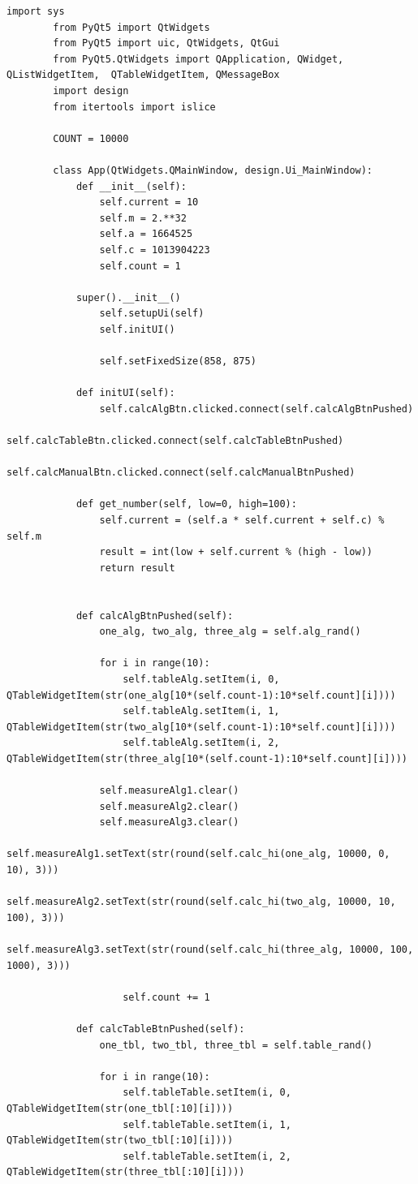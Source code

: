 \documentclass[14pt, a4paper]{extarticle}
\begin{document}
	\begin{lstlisting}[caption=lab3.py]
		import sys
		from PyQt5 import QtWidgets
		from PyQt5 import uic, QtWidgets, QtGui
		from PyQt5.QtWidgets import QApplication, QWidget, QListWidgetItem,  QTableWidgetItem, QMessageBox
		import design
		from itertools import islice
		
		COUNT = 10000
		
		class App(QtWidgets.QMainWindow, design.Ui_MainWindow):
			def __init__(self):
				self.current = 10
				self.m = 2.**32
				self.a = 1664525
				self.c = 1013904223
				self.count = 1
			
			super().__init__()
				self.setupUi(self)
				self.initUI()    
				
				self.setFixedSize(858, 875) 
			
			def initUI(self):
				self.calcAlgBtn.clicked.connect(self.calcAlgBtnPushed)
				self.calcTableBtn.clicked.connect(self.calcTableBtnPushed)
				self.calcManualBtn.clicked.connect(self.calcManualBtnPushed)
				
			def get_number(self, low=0, high=100):
				self.current = (self.a * self.current + self.c) % self.m
				result = int(low + self.current % (high - low))
				return result
			
			
			def calcAlgBtnPushed(self):
				one_alg, two_alg, three_alg = self.alg_rand()
			
				for i in range(10):
					self.tableAlg.setItem(i, 0, QTableWidgetItem(str(one_alg[10*(self.count-1):10*self.count][i])))
					self.tableAlg.setItem(i, 1, QTableWidgetItem(str(two_alg[10*(self.count-1):10*self.count][i])))
					self.tableAlg.setItem(i, 2, QTableWidgetItem(str(three_alg[10*(self.count-1):10*self.count][i])))
					
				self.measureAlg1.clear()
				self.measureAlg2.clear()
				self.measureAlg3.clear()
				self.measureAlg1.setText(str(round(self.calc_hi(one_alg, 10000, 0, 10), 3)))
				self.measureAlg2.setText(str(round(self.calc_hi(two_alg, 10000, 10, 100), 3)))
				self.measureAlg3.setText(str(round(self.calc_hi(three_alg, 10000, 100, 1000), 3)))
					
					self.count += 1
			
			def calcTableBtnPushed(self):
				one_tbl, two_tbl, three_tbl = self.table_rand()

				for i in range(10):
					self.tableTable.setItem(i, 0, QTableWidgetItem(str(one_tbl[:10][i])))
					self.tableTable.setItem(i, 1, QTableWidgetItem(str(two_tbl[:10][i])))
					self.tableTable.setItem(i, 2, QTableWidgetItem(str(three_tbl[:10][i])))
	

\end{lstlisting}
\end{document}
